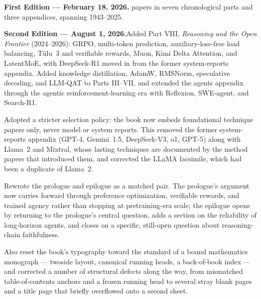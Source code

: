 
\noindent\textbf{First Edition --- February 18, 2026.} papers in seven chronological
parts and three appendices, spanning 1943--2025.

\medskip
\noindent\textbf{Second Edition --- August 1, 2026.}\quad Added Part VIII, \emph{Reasoning and
the Open Frontier} (2024--2026): GRPO, multi-token prediction, auxiliary-loss-free load
balancing, T\"ulu~3 and verifiable rewards, Muon, Kimi Delta Attention, and LatentMoE, with
DeepSeek-R1 moved in from the former system-reports appendix. Added knowledge distillation,
AdamW, RMSNorm, speculative decoding, and LLM-QAT to Parts III--VII, and extended the agents
appendix through the agentic reinforcement-learning era with Reflexion, SWE-agent, and
Search-R1.

Adopted a stricter selection policy: the book now embeds foundational technique papers only,
never model or system reports. This removed the former system-reports appendix (GPT-4,
Gemini~1.5, DeepSeek-V3, o1, GPT-5) along with Llama~2 and Mixtral, whose lasting techniques are
documented by the method papers that introduced them, and corrected the LLaMA facsimile, which
had been a duplicate of Llama~2.

Rewrote the prologue and epilogue as a matched pair. The prologue's argument now carries forward
through preference optimization, verifiable rewards, and trained agency rather than stopping at
pretraining-era scale; the epilogue opens by returning to the prologue's central question, adds a
section on the reliability of long-horizon agents, and closes on a specific, still-open question
about reasoning-chain faithfulness.

\medskip
Also reset the book's typography toward the standard of a bound mathematics monograph ---
twoside layout, canonical running heads, a back-of-book index --- and corrected a number of
structural defects along the way, from mismatched table-of-contents anchors and a frozen running
head to several stray blank pages and a title page that briefly overflowed onto a second sheet.

